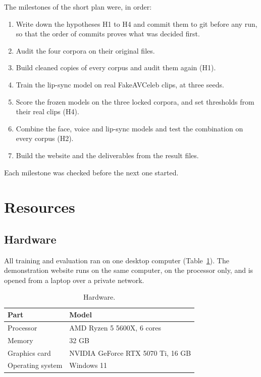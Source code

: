 The milestones of the short plan were, in order:

\begin{enumerate}
    \item Write down the hypotheses H1 to H4 and commit them to git before any
    run, so that the order of commits proves what was decided first.
    \item Audit the four corpora on their original files.
    \item Build cleaned copies of every corpus and audit them again (H1).
    \item Train the lip-sync model on real FakeAVCeleb clips, at three seeds.
    \item Score the frozen models on the three locked corpora, and set
    thresholds from their real clips (H4).
    \item Combine the face, voice and lip-sync models and test the combination
    on every corpus (H2).
    \item Build the website and the deliverables from the result files.
\end{enumerate}

Each milestone was checked before the next one started.

\section{Resources}
\label{sec:m-resources}

\subsection{Hardware}

All training and evaluation ran on one desktop computer (Table~\ref{tab:hardware}).
The demonstration website runs on the same computer, on the processor only,
and is opened from a laptop over a private network.

\begin{table}[ht]
    \centering
    \small
    \caption{Hardware.}
    \label{tab:hardware}
    \begin{tabular}{@{}l l@{}}
        \toprule
        \textbf{Part} & \textbf{Model} \\
        \midrule
        Processor & AMD Ryzen 5 5600X, 6 cores \\
        Memory & 32 GB \\
        Graphics card & NVIDIA GeForce RTX 5070 Ti, 16 GB \\
        Operating system & Windows 11 \\
        \bottomrule
    \end{tabular}
\end{table}


